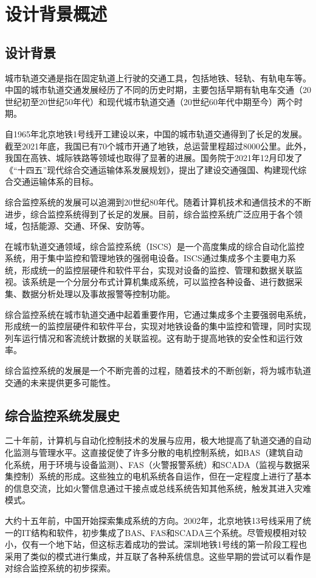 \chapter{设计背景概述}
\section{设计背景}
城市轨道交通是指在固定轨道上行驶的交通工具，包括地铁、轻轨、有轨电车等。中国的城市轨道交通发展经历了不同的历史时期，主要包括早期有轨电车交通（20世纪初至20世纪50年代）和现代城市轨道交通（20世纪60年代中期至今）两个时期。

自1965年北京地铁1号线开工建设以来，中国的城市轨道交通得到了长足的发展。截至2021年底，我国已有70个城市开通了地铁，总运营里程超过8000公里。此外，我国在高铁、城际铁路等领域也取得了显著的进展。国务院于2021年12月印发了《“十四五”现代综合交通运输体系发展规划》，提出了建设交通强国、构建现代综合交通运输体系的目标。

综合监控系统的发展可以追溯到20世纪80年代。随着计算机技术和通信技术的不断进步，综合监控系统得到了长足的发展。目前，综合监控系统广泛应用于各个领域，包括能源、交通、环保、安防等。

在城市轨道交通领域，综合监控系统（ISCS）是一个高度集成的综合自动化监控系统，用于集中监控和管理地铁的强弱电设备。ISCS通过集成多个主要电力系统，形成统一的监控层硬件和软件平台，实现对设备的监控、管理和数据关联监视。该系统是一个分层分布式计算机集成系统，可以监控各种设备、进行数据采集、数据分析处理以及事故报警等控制功能。

综合监控系统在城市轨道交通中起着重要作用，它通过集成多个主要强弱电系统，形成统一的监控层硬件和软件平台，实现对地铁设备的集中监控和管理，同时实现列车运行情况和客流统计数据的关联监视。这有助于提高地铁的安全性和运行效率。

综合监控系统的发展是一个不断完善的过程，随着技术的不断创新，将为城市轨道交通的未来提供更多可能性。

\section{综合监控系统发展史}
二十年前，计算机与自动化控制技术的发展与应用，极大地提高了轨道交通的自动化监测与管理水平。这直接促使了许多分散的电机控制系统，如BAS（建筑自动化系统，用于环境与设备监测）、FAS（火警报警系统）和SCADA（监视与数据采集控制）系统的形成。这些独立的电机系统各自运作，但在一定程度上进行了基本的信息交流，比如火警信息通过干接点或总线系统告知其他系统，触发其进入灾难模式。

大约十五年前，中国开始探索集成系统的方向。2002年，北京地铁13号线采用了统一的IT结构和软件，初步集成了BAS、FAS和SCADA三个系统。尽管规模相对较小，仅有一个地下站，但这标志着成功的尝试。深圳地铁1号线的第一阶段工程也采用了类似的模式进行集成，并互联了各种系统信息。这些早期的尝试可以看作是对综合监控系统的初步探索。


